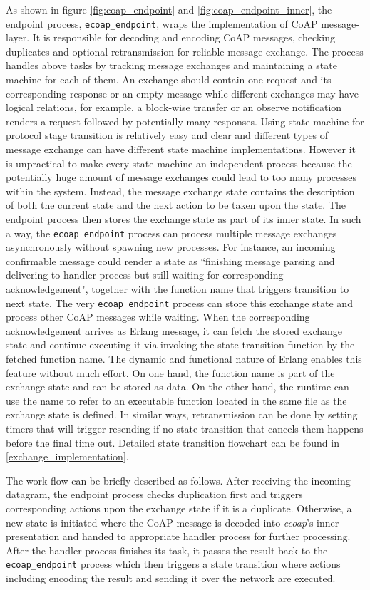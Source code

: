 As shown in figure \ref{fig:coap_endpoint} and \ref{fig:coap_endpoint_inner}, the endpoint process, \verb|ecoap_endpoint|, wraps the implementation of CoAP message-layer. It is responsible for decoding and encoding CoAP messages, checking duplicates and optional retransmission for reliable message exchange. The process handles above tasks by tracking message exchanges and maintaining a state machine for each of them. An exchange should contain one request and its corresponding response or an empty message while different exchanges may have logical relations, for example, a block-wise transfer or an observe notification renders a request followed by potentially many responses. Using state machine for protocol stage transition is relatively easy and clear and different types of message exchange can have different state machine implementations. However it is unpractical to make every state machine an independent process because the potentially huge amount of message exchanges could lead to too many processes within the system. Instead, the message exchange state contains the description of both the current state and the next action to be taken upon the state. The endpoint process then stores the exchange state as part of its inner state. In such a way, the \verb|ecoap_endpoint| process can process multiple message exchanges asynchronously without spawning new processes. For instance, an incoming confirmable message could render a state as ``finishing message parsing and delivering to handler process but still waiting for corresponding acknowledgement", together with the function name that triggers transition to next state. The very \verb|ecoap_endpoint| process can store this exchange state and process other CoAP messages while waiting. When the corresponding acknowledgement arrives as Erlang message, it can fetch the stored exchange state and continue executing it via invoking the state transition function by the fetched function name. The dynamic and functional nature of Erlang enables this feature without much effort. On one hand, the function name is part of the exchange state and can be stored as data. On the other hand, the runtime can use the name to refer to an executable function located in the same file as the exchange state is defined. In similar ways, retransmission can be done by setting timers that will trigger resending if no state transition that cancels them happens before the final time out. Detailed state transition flowchart can be found in \ref{exchange_implementation}.

The work flow can be briefly described as follows. After receiving the incoming datagram, the endpoint process checks duplication first and triggers corresponding actions upon the exchange state if it is a duplicate. Otherwise, a new state is initiated where the CoAP message is decoded into \textit{ecoap}'s inner presentation and handed to appropriate handler process for further processing. After the handler process finishes its task, it passes the result back to the \verb|ecoap_endpoint| process which then  triggers a state transition where actions including encoding the result and sending it over the network are executed.

